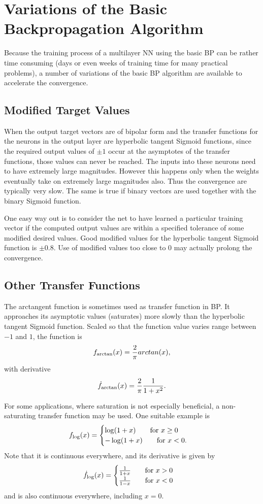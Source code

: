 \documentclass[fleqn]{article}
\begin{document}
\section{Variations of the Basic Backpropagation Algorithm}

Because the training process of a multilayer NN using the basic BP can be rather time consuming
(days or even weeks of training time for many practical problems),
a number of variations of the basic BP algorithm
are available to accelerate the convergence.


\subsection{Modified Target Values}

When the output target vectors are of bipolar form and
the transfer functions for the neurons in the output layer are hyperbolic tangent Sigmoid functions,
since the required output values of $\pm1$ occur at the asymptotes of the transfer functions,
those values can never be reached.
The inputs into these neurons need to have extremely large magnitudes.
However this happens only when the weights eventually take on extremely large magnitudes also.
Thus the convergence are typically very slow.
The same is true if binary vectors are used together with the binary Sigmoid function.

One easy way out is to consider the net to have learned a particular training vector if the computed output values
are within a specified tolerance of some modified desired values.
Good modified values for the hyperbolic tangent Sigmoid function is $\pm 0.8$.
Use of modified values too close to $0$ may actually prolong the convergence.

\subsection{Other Transfer Functions}
The arctangent function is sometimes used as transfer function in BP.
It approaches its asymptotic values (saturates) more slowly than the hyperbolic tangent Sigmoid function.
Scaled so that the function value varies range between $-1$ and $1$, the function is
\[
f_{\mbox{\scriptsize{arctan}}}(x) = \frac{2}{\pi} arctan(x),
\]
with derivative
\[
\dot f_{\mbox{\scriptsize{arctan}}}(x) = \frac{2}{\pi} \frac{1}{1+x^2}.
\]

For some applications, where saturation is not especially beneficial,
a non-saturating transfer function may be used.
One suitable example is
\[
f_{\mbox{\scriptsize{log}}}(x) =
\begin{cases}
\log(1+x) \qquad \mbox{for $x \ge 0$} \\
-\log(1+x) \qquad \mbox{for $x<0$}.
\end{cases}
\]
Note that it is continuous everywhere, and its derivative is given by
\[
\dot f_{\mbox{\scriptsize{log}}}(x) =
\begin{cases}
\frac{1}{1+x} \qquad \mbox{for $x>0$} \\
\frac{1}{1-x} \qquad \mbox{for $x<0$}
\end{cases}
\]
and is also continuous everywhere, including $x=0$.
\end{document}

